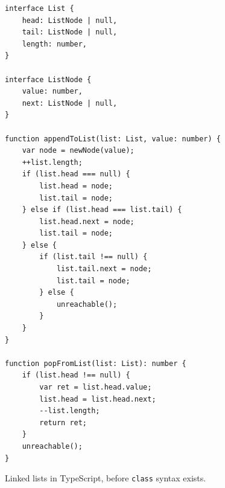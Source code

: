 \documentclass[a4paper,10pt,twocolumn]{article}
\theoremstyle{definition}
\newcommand*{\code}{\texttt}
\begin{document}
\begin{figure}[h]
\begin{verbatim}
interface List {
    head: ListNode | null,
    tail: ListNode | null,
    length: number,
}

interface ListNode {
    value: number,
    next: ListNode | null,
}

function appendToList(list: List, value: number) {
    var node = newNode(value);
    ++list.length;
    if (list.head === null) {
        list.head = node;
        list.tail = node;
    } else if (list.head === list.tail) {
        list.head.next = node;
        list.tail = node;
    } else {
        if (list.tail !== null) {
            list.tail.next = node;
            list.tail = node;
        } else {
            unreachable();
        }
    }
}

function popFromList(list: List): number {
    if (list.head !== null) {
        var ret = list.head.value;
        list.head = list.head.next;
        --list.length;
        return ret;
    }
    unreachable();
}
\end{verbatim}
  \caption{Linked lists in TypeScript, before \code{class} syntax exists.}
\end{figure}

\twocolumn
\printbibliography
\end{document}
